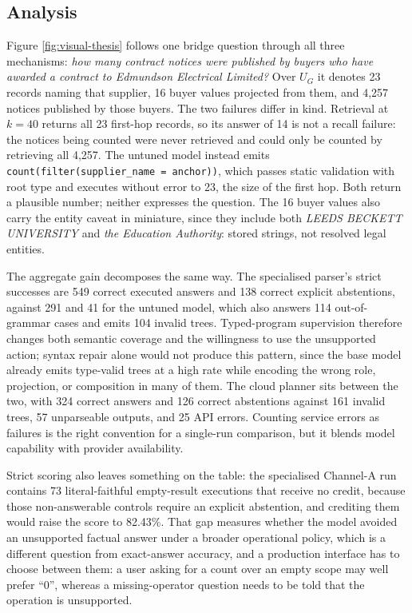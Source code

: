 \subsection{Analysis}
\label{sec:analysis-body}

Figure \ref{fig:visual-thesis} follows one bridge question through all three mechanisms:
\emph{how many contract notices were published by buyers who have awarded a contract to Edmundson
Electrical Limited?}  Over $U_G$ it denotes 23 records naming that supplier, 16 buyer values
projected from them, and 4{,}257 notices published by those buyers.  The two failures differ in
kind.  Retrieval at $k{=}40$ returns all 23 first-hop records, so its answer of 14 is not a recall
failure: the notices being counted were never retrieved and could only be counted by retrieving
all 4{,}257.  The untuned model instead emits \texttt{count(filter(supplier\_name = anchor))},
which passes static validation with root type \numbertype{} and executes without error to 23, the
size of the first hop.  Both return a plausible number; neither expresses the question.  The 16
buyer values also carry the entity caveat in miniature, since they include both \emph{LEEDS
BECKETT UNIVERSITY} and \emph{the Education Authority}: stored strings, not resolved legal
entities.

The aggregate gain decomposes the same way.  The specialised parser's \PacsOursCorrectA{} strict
successes are 549 correct executed answers and 138 correct explicit abstentions, against 291 and
41 for the untuned model, which also answers 114 out-of-grammar cases and emits 104 invalid
trees.  Typed-program supervision therefore changes both semantic coverage and the willingness to
use the unsupported action; syntax repair alone would not produce this pattern, since the base
model already emits type-valid trees at a high rate while encoding the wrong role, projection, or
composition in many of them.  The cloud planner sits between the two, with 324 correct answers and
126 correct abstentions against 161 invalid trees, 57 unparseable outputs, and 25 API errors.
Counting service errors as failures is the right convention for a single-run comparison, but it
blends model capability with provider availability.

Strict scoring also leaves something on the table: the specialised Channel-A run contains 73
literal-faithful empty-result executions that receive no credit, because those non-answerable
controls require an explicit abstention, and crediting them would raise the score to 82.43\%.
That gap measures whether the model avoided an unsupported factual answer under a broader
operational policy, which is a different question from exact-answer accuracy, and a production
interface has to choose between them: a user asking for a count over an empty scope may well
prefer ``0'', whereas a missing-operator question needs to be told that the operation is
unsupported.
